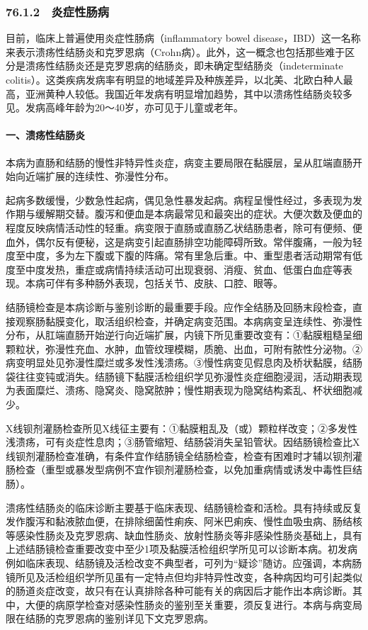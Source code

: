 \subsubsection{76.1.2　炎症性肠病}

目前，临床上普遍使用炎症性肠病（inflammatory bowel
disease，IBD）这一名称来表示溃疡性结肠炎和克罗恩病（Crohn病）。此外，这一概念也包括那些难于区分是溃疡性结肠炎还是克罗恩病的结肠炎，即未确定型结肠炎（indeterminate
colitis）。这类疾病发病率有明显的地域差异及种族差异，以北美、北欧白种人最高，亚洲黄种人较低。我国近年发病有明显增加趋势，其中以溃疡性结肠炎较多见。发病高峰年龄为20～40岁，亦可见于儿童或老年。

\paragraph{一、溃疡性结肠炎}

本病为直肠和结肠的慢性非特异性炎症，病变主要局限在黏膜层，呈从肛端直肠开始向近端扩展的连续性、弥漫性分布。

起病多数缓慢，少数急性起病，偶见急性暴发起病。病程呈慢性经过，多表现为发作期与缓解期交替。腹泻和便血是本病最常见和最突出的症状。大便次数及便血的程度反映病情活动性的轻重。病变限于直肠或直肠乙状结肠患者，除可有便频、便血外，偶尔反有便秘，这是病变引起直肠排空功能障碍所致。常伴腹痛，一般为轻度至中度，多为左下腹或下腹的阵痛。常有里急后重。中、重型患者活动期常有低度至中度发热，重症或病情持续活动可出现衰弱、消瘦、贫血、低蛋白血症等表现。本病可伴有多种肠外表现，包括关节、皮肤、口腔、眼等。

结肠镜检查是本病诊断与鉴别诊断的最重要手段。应作全结肠及回肠末段检查，直接观察肠黏膜变化，取活组织检查，并确定病变范围。本病病变呈连续性、弥漫性分布，从肛端直肠开始逆行向近端扩展，内镜下所见重要改变有：①黏膜粗糙呈细颗粒状，弥漫性充血、水肿，血管纹理模糊，质脆、出血，可附有脓性分泌物。②病变明显处见弥漫性糜烂或多发性浅溃疡。③慢性病变见假息肉及桥状黏膜，结肠袋往往变钝或消失。结肠镜下黏膜活检组织学见弥漫性炎症细胞浸润，活动期表现为表面糜烂、溃疡、隐窝炎、隐窝脓肿；慢性期表现为隐窝结构紊乱、杯状细胞减少。

X线钡剂灌肠检查所见X线征主要有：①黏膜粗乱及（或）颗粒样改变；②多发性浅溃疡，可有炎症性息肉；③肠管缩短、结肠袋消失呈铅管状。因结肠镜检查比X线钡剂灌肠检查准确，有条件宜作结肠镜全结肠检查，检查有困难时才辅以钡剂灌肠检查（重型或暴发型病例不宜作钡剂灌肠检查，以免加重病情或诱发中毒性巨结肠）。

溃疡性结肠炎的临床诊断主要基于临床表现、结肠镜检查和活检。具有持续或反复发作腹泻和黏液脓血便，在排除细菌性痢疾、阿米巴痢疾、慢性血吸虫病、肠结核等感染性肠炎及克罗恩病、缺血性肠炎、放射性肠炎等非感染性肠炎基础上，具有上述结肠镜检查重要改变中至少1项及黏膜活检组织学所见可以诊断本病。初发病例如临床表现、结肠镜及活检改变不典型者，可列为“疑诊”随访。应强调，本病肠镜所见及活检组织学所见虽有一定特点但均非特异性改变，各种病因均可引起类似的肠道炎症改变，故只有在认真排除各种可能有关的病因后才能作出本病诊断。其中，大便的病原学检查对感染性肠炎的鉴别至关重要，须反复进行。本病与病变局限在结肠的克罗恩病的鉴别详见下文克罗恩病。

